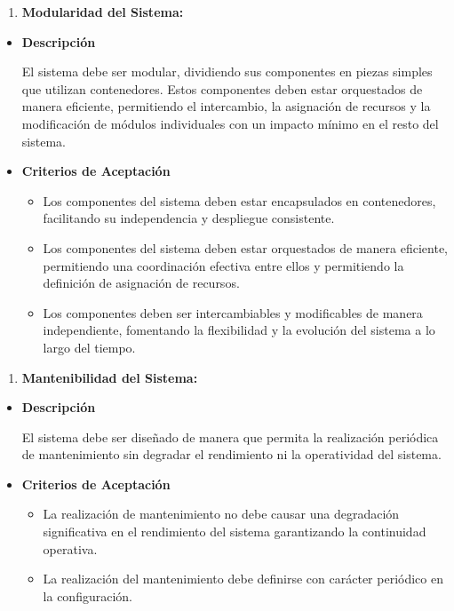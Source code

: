 \documentclass[
  12pt,
  openany]{book}
\providecommand{\tightlist}{%
  \setlength{\itemsep}{0pt}\setlength{\parskip}{0pt}}
\begin{document}
\begin{enumerate}
\def\labelenumi{\arabic{enumi}.}
\setcounter{enumi}{4}
\tightlist
\item
  \textbf{Modularidad del Sistema:}
\end{enumerate}

\begin{itemize}
\item
  \textbf{Descripción}

  El sistema debe ser modular, dividiendo sus componentes en piezas simples que utilizan contenedores. Estos componentes deben estar orquestados de manera eficiente, permitiendo el intercambio, la asignación de recursos y la modificación de módulos individuales con un impacto mínimo en el resto del sistema.
\item
  \textbf{Criterios de Aceptación}

  \begin{itemize}
  \item
    Los componentes del sistema deben estar encapsulados en contenedores, facilitando su independencia y despliegue consistente.
  \item
    Los componentes del sistema deben estar orquestados de manera eficiente, permitiendo una coordinación efectiva entre ellos y permitiendo la definición de asignación de recursos.
  \item
    Los componentes deben ser intercambiables y modificables de manera independiente, fomentando la flexibilidad y la evolución del sistema a lo largo del tiempo.
  \end{itemize}
\end{itemize}

\begin{enumerate}
\def\labelenumi{\arabic{enumi}.}
\setcounter{enumi}{5}
\tightlist
\item
  \textbf{Mantenibilidad del Sistema:}
\end{enumerate}

\begin{itemize}
\item
  \textbf{Descripción}

  El sistema debe ser diseñado de manera que permita la realización periódica de mantenimiento sin degradar el rendimiento ni la operatividad del sistema.
\item
  \textbf{Criterios de Aceptación}

  \begin{itemize}
  \item
    La realización de mantenimiento no debe causar una degradación significativa en el rendimiento del sistema garantizando la continuidad operativa.
  \item
    La realización del mantenimiento debe definirse con carácter periódico en la configuración.
  \end{itemize}
\end{itemize}
\end{document}
